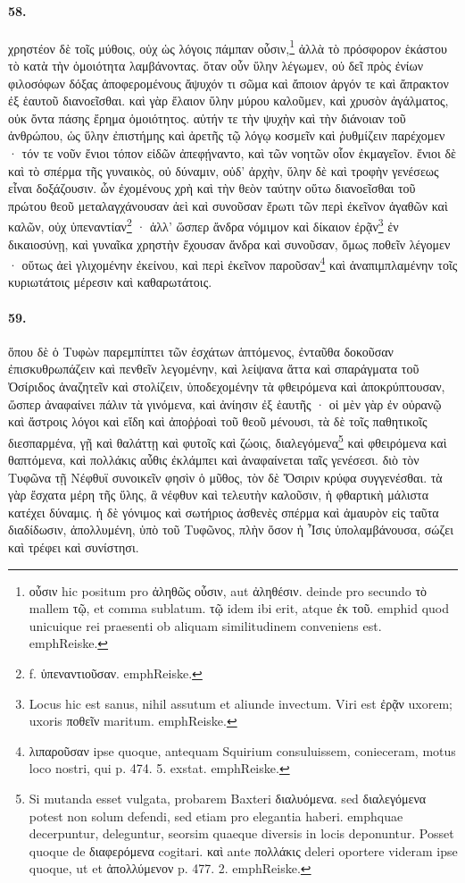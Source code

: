 \documentclass[a4paper, 11pt, oneside, polutonikogreek, german]{article}
\begin{document}
\paragraph{58.}
χρηστέον δὲ τοῖς μύθοις, οὐχ ὡς λόγοις πάμπαν οὖσιν,\footnote{οὖσιν hic positum pro ἀληθῶς οὖσιν, aut ἀληθέσιν. deinde pro secundo τὸ mallem τῷ, et comma sublatum. τῷ idem ibi erit, atque ἐκ τοῦ. emph{id quod unicuique rei praesenti ob aliquam similitudinem conveniens est.} emph{Reiske.}} ἀλλὰ τὸ πρόσφορον ἑκάστου τὸ κατὰ τὴν ὁμοιότητα λαμβάνοντας. ὅταν οὖν ὕλην λέγωμεν, οὐ δεῖ πρὸς ἐνίων φιλοσόφων δόξας ἀποφερομένους ἄψυχόν τι σῶμα καὶ ἄποιον ἀργόν τε καὶ ἄπρακτον ἐξ ἑαυτοῦ διανοεῖσθαι. καὶ γὰρ ἔλαιον ὕλην μύρου καλοῦμεν, καὶ χρυσὸν ἀγάλματος, οὐκ ὄντα πάσης ἔρημα ὁμοιότητος. αὐτήν τε τὴν ψυχὴν καὶ τὴν διάνοιαν τοῦ ἀνθρώπου, ὡς ὕλην ἐπιστήμης καὶ ἀρετῆς τῷ λόγῳ κοσμεῖν καὶ ῥυθμίζειν παρέχομεν · τόν τε νοῦν ἔνιοι τόπον εἰδῶν ἀπεφῄναντο, καὶ τῶν νοητῶν οἷον ἐκμαγεῖον. ἔνιοι δὲ καὶ τὸ σπέρμα τῆς γυναικὸς, οὐ δύναμιν, οὐδ' ἀρχὴν, ὕλην δὲ καὶ τροφὴν γενέσεως εἶναι δοξάζουσιν. ὧν ἐχομένους χρὴ καὶ τὴν θεὸν ταύτην οὕτω διανοεῖσθαι τοῦ πρώτου θεοῦ μεταλαγχάνουσαν ἀεὶ καὶ συνοῦσαν ἔρωτι τῶν περὶ ἐκεῖνον ἀγαθῶν καὶ καλῶν, οὐχ ὑπεναντίαν\footnote{f. ὑπεναντιοῦσαν. emph{Reiske.}} · ἀλλ' ὥσπερ ἄνδρα νόμιμον καὶ δίκαιον ἐρᾷν\footnote{Locus hic est sanus, nihil assutum et aliunde invectum. Viri est ἐρᾷν uxorem; uxoris ποθεῖν maritum. emph{Reiske.}} ἐν δικαιοσύνῃ, καὶ γυναῖκα χρηστὴν ἔχουσαν ἄνδρα καὶ συνοῦσαν, ὅμως ποθεῖν λέγομεν · οὕτως ἀεὶ γλιχομένην ἐκείνου, καὶ περὶ ἐκεῖνον παροῦσαν\footnote{λιπαροῦσαν ipse quoque, antequam Squirium consuluissem, conieceram, motus loco nostri, qui p. 474. 5. exstat. emph{Reiske.}} καὶ ἀναπιμπλαμένην τοῖς κυριωτάτοις μέρεσιν καὶ καθαρωτάτοις.

\paragraph{59.}
ὅπου δὲ ὁ Τυφὼν παρεμπίπτει τῶν ἐσχάτων ἁπτόμενος, ἐνταῦθα δοκοῦσαν ἐπισκυθρωπάζειν καὶ πενθεῖν λεγομένην, καὶ λείψανα ἄττα καὶ σπαράγματα τοῦ Ὀσίριδος ἀναζητεῖν καὶ στολίζειν, ὑποδεχομένην τὰ φθειρόμενα καὶ ἀποκρύπτουσαν, ὥσπερ ἀναφαίνει πάλιν τὰ γινόμενα, καὶ ἀνίησιν ἐξ ἑαυτῆς · οἱ μὲν γὰρ ἐν οὐρανῷ καὶ ἄστροις λόγοι καὶ εἴδη καὶ ἀποῤῥοαὶ τοῦ θεοῦ μένουσι, τὰ δὲ τοῖς παθητικοῖς διεσπαρμένα, γῇ καὶ θαλάττῃ καὶ φυτοῖς καὶ ζώοις, διαλεγόμενα\footnote{Si mutanda esset vulgata, probarem Baxteri διαλυόμενα. sed διαλεγόμενα potest non solum defendi, sed etiam pro elegantia haberi. emph{quae decerpuntur, deleguntur, seorsim quaeque diversis in locis deponuntur.} Posset quoque de διαφερόμενα cogitari. καὶ ante πολλάκις deleri oportere videram ipse quoque, ut et ἀπολλύμενον p. 477. 2. emph{Reiske.}} καὶ φθειρόμενα καὶ θαπτόμενα, καὶ πολλάκις αὖθις ἐκλάμπει καὶ ἀναφαίνεται ταῖς γενέσεσι. διὸ τὸν Τυφῶνα τῇ Νέφθυϊ συνοικεῖν φησὶν ὁ μῦθος, τὸν δὲ Ὄσιριν κρύφα συγγενέσθαι. τὰ γὰρ ἔσχατα μέρη τῆς ὕλης, ἃ νέφθυν καὶ τελευτὴν καλοῦσιν, ἡ φθαρτικὴ μάλιστα κατέχει δύναμις. ἡ δὲ γόνιμος καὶ σωτήριος ἀσθενὲς σπέρμα καὶ ἀμαυρὸν εἰς ταῦτα διαδίδωσιν, ἀπολλυμένη, ὑπὸ τοῦ Τυφῶνος, πλὴν ὅσον ἡ Ἶσις ὑπολαμβάνουσα, σώζει καὶ τρέφει καὶ συνίστησι.
\end{document}
